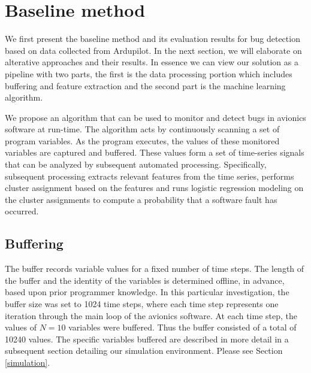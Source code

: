 \section{Baseline method} \label{methods}

We first present the baseline method and its evaluation results for
bug detection based on data collected from Ardupilot. In the next
section, we will elaborate on alterative approaches and their
results. In essence we can view our solution as a pipeline with two
parts, the first is the data processing portion which includes
buffering and feature extraction and the second part is the machine
learning algorithm. 


We propose an algorithm that can be used to monitor and detect bugs in
avionics software at run-time. The algorithm acts by continuously
scanning a set of program variables. As the program executes, the
values of these monitored variables are captured and buffered. These
values form a set of time-series signals that can be analyzed by
subsequent automated processing.  Specifically, subsequent processing
extracts relevant features from the time series, performs cluster
assignment based on the features and runs logistic regression modeling
on the cluster assignments to compute a probability that a software
fault has occurred. 

\subsection{Buffering}

The buffer records variable values for a fixed number of time
steps. The length of the buffer and the identity of the variables is
determined offline, in advance, based upon prior programmer
knowledge. In this particular investigation, the buffer size was set
to 1024 time steps, where each time step represents one iteration through the main
loop of the avionics software. At each time step, the values of $N =10$
variables were buffered. Thus the buffer consisted of a total of
10240 values. The specific variables buffered are described in more
detail in a subsequent section detailing our simulation
environment. Please see Section \ref{simulation}.


